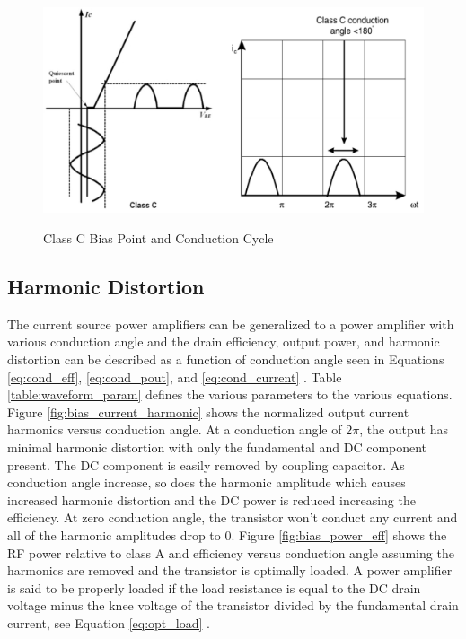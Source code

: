 \begin{figure}
  \centering
  \includegraphics[width=6in]{figures/classes/classc_bias}\\
  \caption{Class C Bias Point and Conduction Cycle \cite{Rosu2001}}\label{classc_bias}
\end{figure}

\subsection{Harmonic Distortion}

The current source power amplifiers can be generalized to a power amplifier with various conduction angle and the drain efficiency, output power, and harmonic distortion can be described as a function of conduction angle seen in Equations \ref{eq:cond_eff}, \ref{eq:cond_pout}, and \ref{eq:cond_current} \cite{Hella}. Table \ref{table:waveform_param} defines the various parameters to the various equations. Figure \ref{fig:bias_current_harmonic} shows the normalized output current harmonics versus conduction angle. At a conduction angle of $2\pi$, the output has minimal harmonic distortion with only the fundamental and DC component  present. The DC component is easily removed by coupling capacitor. As conduction angle increase, so does the harmonic amplitude which causes increased harmonic distortion and the DC power is reduced increasing the efficiency. At zero conduction angle, the transistor won't conduct any current and all of the harmonic amplitudes drop to 0. Figure \ref{fig:bias_power_eff} shows the RF power relative to class A and efficiency versus conduction angle assuming the harmonics are removed and the transistor is optimally loaded. A power amplifier is said to be properly loaded if the load resistance is equal to the DC drain voltage minus the knee voltage of the transistor divided by the fundamental drain current, see Equation \ref{eq:opt_load} \cite{Hella}.

